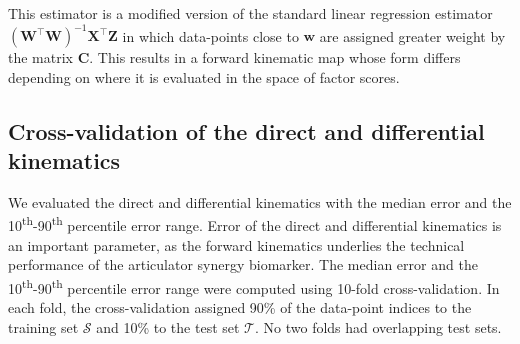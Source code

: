 \documentclass[preprint]{JASAnew}\usepackage[]{graphicx}\usepackage[]{color}
\begin{document}
This estimator is a modified version of the standard linear regression estimator $\left( \mathbf{W}^\intercal \mathbf{W} \right)^{-1} \mathbf{X}^\intercal \mathbf{Z}$ in which data-points close to $\mathbf{w}$ are assigned greater weight by the matrix $\mathbf{C}$. This results in a forward kinematic map whose form differs depending on where it is evaluated in the space of factor scores.










\subsection{Cross-validation of the direct and differential kinematics}
\label{subsec:crossval}

We evaluated the direct and differential kinematics with the median error and the 10\textsuperscript{th}-90\textsuperscript{th} percentile error range.
%
Error of the direct and differential kinematics is an important parameter, as the forward kinematics underlies the technical performance of the articulator synergy biomarker.
%
The median error and the 10\textsuperscript{th}-90\textsuperscript{th} percentile error range were computed using \num{10}-fold cross-validation. 
%
In each fold, the cross-validation assigned 90\% of the data-point indices to the training set $\mathcal{S}$ and 10\% to the test set $\mathcal{T}$.
%
No two folds had overlapping test sets. 
\end{document}
